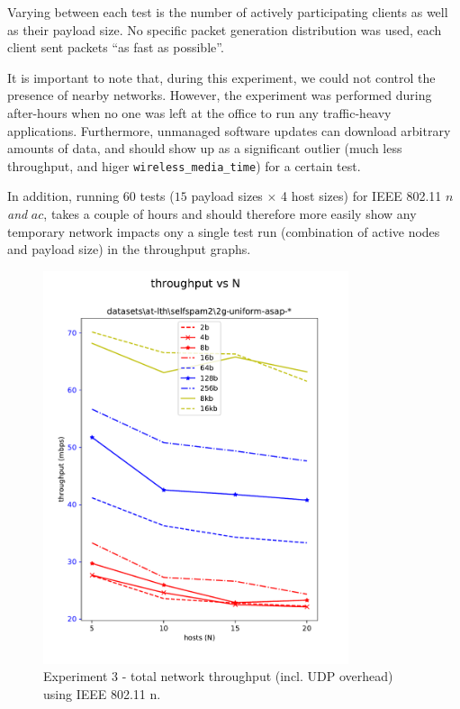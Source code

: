 Varying between each test is the number of actively participating clients as
well as their payload size. No specific packet generation distribution was
used, each client sent packets ``as fast as possible''.

It is important to note that, during this experiment, we could not control the
presence of nearby networks. However, the experiment was performed during
after-hours when no one was left at the office to run any traffic-heavy
applications. Furthermore, unmanaged software updates can download arbitrary
amounts of data, and should show up as a significant outlier (much less
throughput, and higer \texttt{wireless\_media\_time}) for a certain test.

In addition, running 60 tests ($15$ payload sizes $\times$ 4 host sizes) for
IEEE 802.11 $n$ \emph{and} $ac$, takes a couple of hours and should therefore
more easily show any temporary network impacts ony a single test run
(combination of active nodes and payload size) in the throughput graphs.

\begin{figure}[tbp]
  \centering
  \includegraphics[width=0.8\textwidth]{images/exp3_tput.pdf}
  \caption{Experiment 3 - total network throughput (incl. UDP overhead) using IEEE 802.11 n.}
  \label{fig:exp3throughput}
\end{figure}


